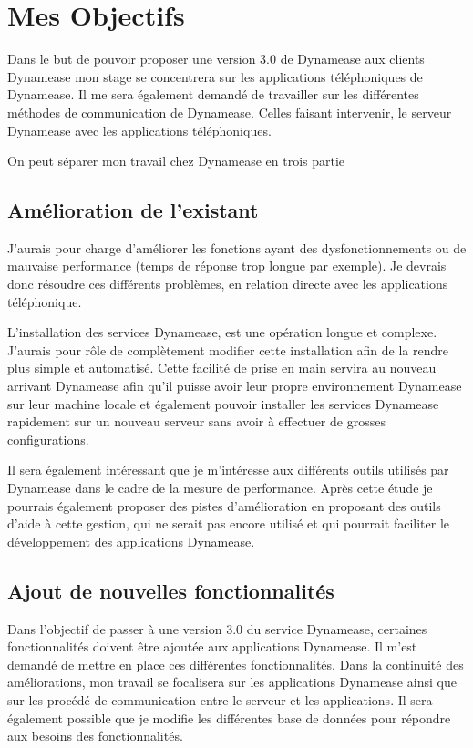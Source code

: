 \section{Mes Objectifs}

 Dans le but de pouvoir proposer une version 3.0 de Dynamease aux clients Dynamease mon stage se concentrera sur les applications téléphoniques de Dynamease. Il me sera également demandé de travailler sur les différentes méthodes de communication de Dynamease. Celles faisant intervenir, le serveur Dynamease avec les applications téléphoniques.

On peut séparer mon travail chez Dynamease en trois partie 

\subsection{Amélioration de l'existant}

J'aurais pour charge d'améliorer les fonctions ayant des dysfonctionnements ou de mauvaise performance (temps de réponse trop longue par exemple). Je devrais donc résoudre ces différents problèmes, en relation directe avec les applications téléphonique.

L'installation des services Dynamease, est une opération longue et complexe. J'aurais pour rôle de complètement modifier cette installation afin de la rendre plus simple et automatisé. Cette facilité de prise en main servira au nouveau arrivant Dynamease afin qu'il puisse avoir leur propre environnement Dynamease sur leur machine locale et également pouvoir installer les services Dynamease rapidement sur un nouveau serveur sans avoir à effectuer de grosses configurations.

Il sera également intéressant que je m’intéresse aux différents outils utilisés par Dynamease dans le cadre de la mesure de performance. Après cette étude je pourrais également proposer des pistes d'amélioration en proposant des outils d'aide à cette gestion, qui ne serait pas encore utilisé et qui pourrait faciliter le développement des applications Dynamease.


\subsection{Ajout de nouvelles fonctionnalités}

Dans l'objectif de passer à une version 3.0 du service Dynamease, certaines fonctionnalités doivent être ajoutée aux applications Dynamease. Il m'est demandé de mettre en place ces différentes fonctionnalités. Dans la continuité des améliorations, mon travail se focalisera sur les applications Dynamease ainsi que sur les procédé de communication entre le serveur et les applications. Il sera également possible que je modifie les différentes base de données pour répondre aux besoins des fonctionnalités.

